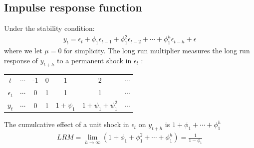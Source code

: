 \documentclass[a4paper,twoside,11pt]{article}
\begin{document}
\subsection{Impulse response function}
\noindent Under the stability condition:
\begin{equation*}
\begin{aligned}
y_t = \epsilon_t + \phi_1 \epsilon_{t-1}+\phi_1^2 \epsilon_{t-2} + \cdots + \phi_1^h \epsilon_{t-h} + \epsilon
\end{aligned}
\end{equation*}
where we let $\mu=0$ for simplicity.
\newline
\newline
The long run multiplier measures the long run response of $y_{t+h}$ to a
permanent shock in $\epsilon_t$ :
\begin{center}
\begin{tabular}{c c c c c c c} 
 \hline
$t$ & $\cdots$ & -1 & 0 & 1 & 2 & $\cdots$ \\ 
$\epsilon_t$ & $\cdots$ & 0 & 1 & 1 & 1 & $\cdots$ \\
$y_t$ & $\cdots$ & 0 & 1 & $1+\psi_1$ & $1+\psi_1+\psi_1^2$ & $\cdots$ \\
 \hline
\end{tabular}
\end{center}
The cumulcative effect of a unit shock in $\epsilon_t$ on $y_{t+h}$ is $1+ \phi_1 + \cdots + \phi_1^h$
\begin{equation*}
\begin{aligned}
LRM = \underset{h \rightarrow \infty}{\lim} (1+ \phi_1 + \phi_1^2 + \cdots + \phi_1^h) = \frac{1}{1-\phi_1}
\end{aligned}
\end{equation*}
\end{document}
